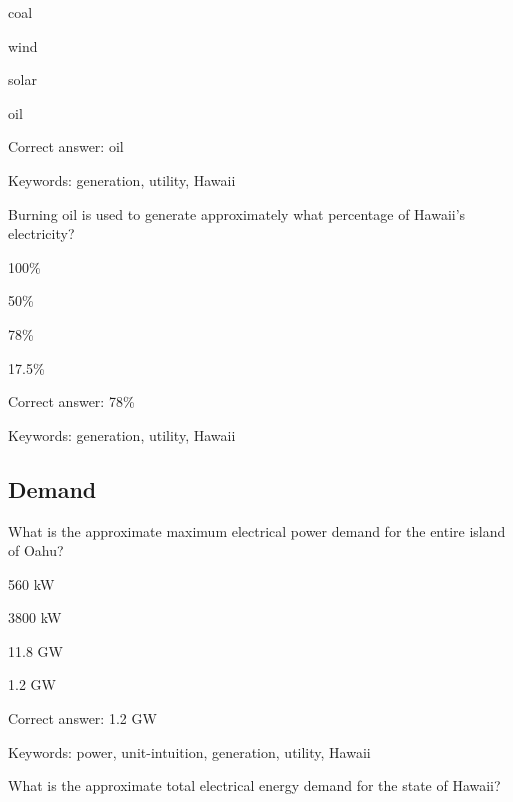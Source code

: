 \begin{answer}
	\item coal
	\item wind
	\item solar
	\item oil
\end{answer}

Correct answer: oil

Keywords: generation, utility, Hawaii

\begin{question}
	\item Burning oil is used to generate approximately what percentage of Hawaii's electricity?
\end{question}

\begin{answer}
	\item 100\%
	\item 50\%
	\item 78\%
	\item 17.5\%
\end{answer}

Correct answer: 78\%

Keywords: generation, utility, Hawaii

\subsection{Demand}

\begin{question}
	\item What is the approximate maximum electrical power demand for the entire island of Oahu?
\end{question}

\begin{answer}
	\item 560 kW
	\item 3800 kW
	\item 11.8 GW
	\item 1.2 GW
\end{answer}

Correct answer: 1.2 GW

Keywords: power, unit-intuition, generation, utility, Hawaii

\begin{question}
	\item What is the approximate total electrical energy demand for the state of Hawaii?
\end{question}

